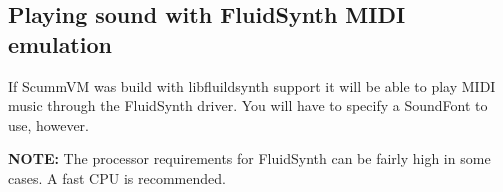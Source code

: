 

\subsection{Playing sound with FluidSynth MIDI emulation}

If ScummVM was build with libfluildsynth support it will be able to play MIDI
music through the FluidSynth driver. You will have to specify a SoundFont to
use, however.

\textbf{NOTE:} The processor requirements for FluidSynth can be fairly high in
some cases. A fast CPU is recommended.
